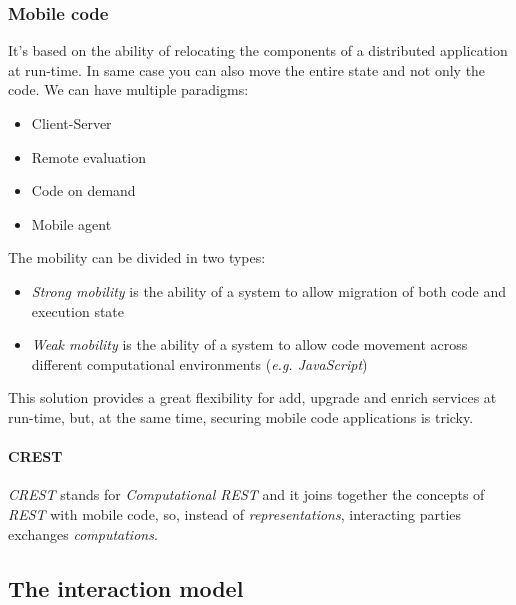     \subsubsection{Mobile code}
    It's based on the ability of relocating the components of a distributed application at run-time.
    In same case you can also move the entire state and not only the code.
    We can have multiple paradigms:
    \begin{itemize}
        \item Client-Server
        \item Remote evaluation
        \item Code on demand
        \item Mobile agent
    \end{itemize}
    The mobility can be divided in two types:
    \begin{itemize}
        \item \textit{Strong mobility} is the ability of a system to allow migration of both code and
            execution state
        \item \textit{Weak mobility} is the ability of a system to allow code movement across different
            computational environments (\textit{e.g. JavaScript})
    \end{itemize}
    This solution provides a great flexibility for add, upgrade and enrich services at run-time, but, 
    at the same time, securing mobile code applications is tricky.
    
    \paragraph{CREST}
    \textit{CREST} stands for \textit{Computational REST} and it joins together the concepts of \textit{REST}
    with mobile code, so, instead of \textit{representations}, interacting parties exchanges \textit{computations}.

    \subsection{The interaction model}
